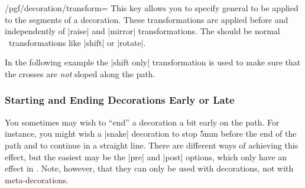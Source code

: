 \begin{key}{/pgf/decoration/transform=}
    This key allows you to specify general  to be applied
    to the segments of a decoration. These transformations are applied before
    and independently of |raise| and |mirror| transformations. The
     should be normal \tikzname\ transformations like
    |shift| or |rotate|.

    In the following example the |shift only| transformation is used to make
    sure that the crosses are \emph{not} sloped along the path.
\begin{codeexample}[preamble={\usetikzlibrary{decorations.shapes}}]
\end{codeexample}
\end{key}


\subsubsection{Starting and Ending Decorations Early or Late}

You sometimes may wish to ``end'' a decoration a bit early on the path. For
instance, you might wish a |snake| decoration to stop 5mm before the end of the
path and to continue in a straight line. There are different ways of achieving
this effect, but the easiest may be the |pre| and |post| options, which only
have an effect in \tikzname. Note, however, that they can only be used with
decorations, not with meta-decorations.

